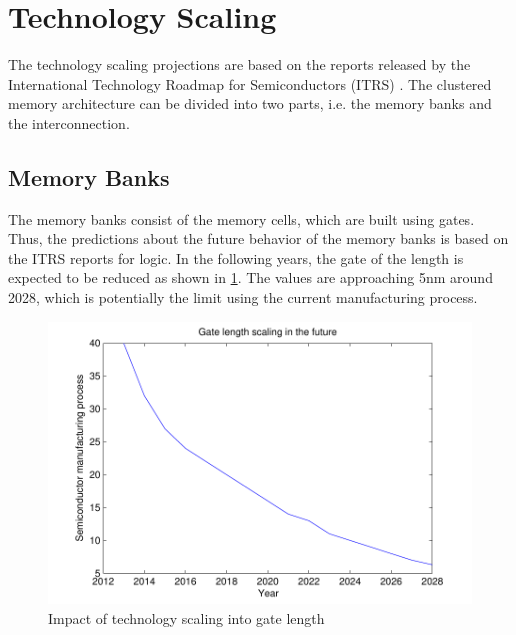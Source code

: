 \section{Technology Scaling}

The technology scaling projections are based on the reports released by the International Technology Roadmap for Semiconductors (ITRS) \cite{itrs}.
The clustered memory architecture can be divided into two parts, i.e. the memory banks and the interconnection.

\subsection{Memory Banks}

The memory banks consist of the memory cells, which are built using gates.
Thus, the predictions about the future behavior of the memory banks is based on the ITRS reports for logic.
In the following years, the gate of the length is expected to be reduced as shown in \ref{fig:gateE}.
The values are approaching 5nm around 2028, which is potentially the limit using the current manufacturing process.

\begin{figure}
 \centering
 \includegraphics[width = \textwidth]{E/gate.pdf}
  \caption{Impact of technology scaling into gate length}
 \label{fig:gateE}
 \end{figure}
 
